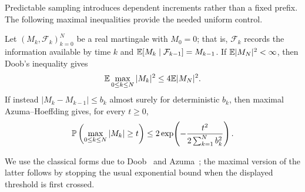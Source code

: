 Predictable sampling introduces dependent increments rather than a fixed
prefix.  The following maximal inequalities provide the needed uniform
control.

\begin{lemma}
\label{lem:martingale-maximal}
Let $(M_k,\mathcal F_k)_{k=0}^N$ be a real martingale with $M_0=0$; that is,
$\mathcal F_k$ records the information available by time $k$ and
$\mathbb{E}[M_k\mid\mathcal F_{k-1}]=M_{k-1}$.
If $\mathbb{E}|M_N|^2<\infty$, then Doob's inequality gives
\begin{equation}
 \mathbb{E}\max_{0\le k\le N}|M_k|^2\le4\mathbb{E}|M_N|^2.
 \label{eq:doob-L2}
\end{equation}
If instead $|M_k-M_{k-1}|\le b_k$ almost surely for deterministic $b_k$,
then maximal Azuma--Hoeffding gives, for every $t\ge0$,
\begin{equation}
 \mathbb{P}\left(\max_{0\le k\le N}|M_k|\ge t\right)
 \le2\exp\!\left(-\frac{t^2}{2\sum_{k=1}^N b_k^2}\right).
 \label{eq:maximal-azuma}
\end{equation}
\end{lemma}

We use the classical forms due to Doob~\cite{Doob1953} and
Azuma~\cite{Azuma1967}; the maximal version of the latter follows by stopping
the usual exponential bound when the displayed threshold is first crossed.
